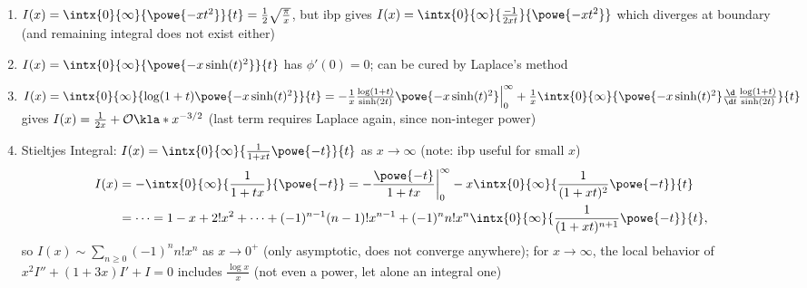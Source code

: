 \documentclass[english, parskip=full]{scrbook}
\newcommand{\example}[3]{\begin{tcolorbox}[colback=colorbackgroundexample,colframe=colorexample, breakable,enhanced,title={\textbf{#1}: #2.}]#3\end{tcolorbox}}
\begin{document}
\example{Four examples}{}{\begin{enumerate}
\item $I(x) = \intx{0}{\infty}{\powe{-xt^2}}{t} = \frac{1}{2} \sqrt{\frac{\pi}{x}}$, but \gls{ibp} gives $I(x) = \intx{0}{\infty}{\frac{-1}{2xt}}{\powe{-xt^2}}$ which diverges at boundary (and remaining integral does not exist either)
\item $I(x)=\intx{0}{\infty}{\powe{-x\sinh(t)^2}}{t}$ has $\phi'(0)=0$; can be cured by Laplace's method
\item $I(x) = \intx{0}{\infty}{\log(1+t) \powe{-x\sinh(t)^2}}{t} = -\frac{1}{x} \frac{\log(1+t)}{\sinh(2t)} \powe{-x\sinh(t)^2} \Big\vert_0^\infty + \frac{1}{x} \intx{0}{\infty}{\powe{-x\sinh(t)^2} \frac{\d}{\d t} \frac{\log(1+t)}{\sinh(2t)}}{t}$ gives $I(x) = \frac{1}{2x} + \mathcal{O}\kla*{x^{-3/2}}$ (last term requires Laplace again, since non-integer power)
\item Stieltjes Integral: $I(x) = \intx{0}{\infty}{\frac{1}{1+xt} \powe{-t}}{t}$ as $x\rightarrow\infty$ (note: \gls{ibp} useful for small $x$) \begin{align}
I(x) &= -\intx{0}{\infty}{\frac{1}{1+tx}}{\powe{-t}} = -\frac{\powe{-t}}{1+tx}\bigg\vert_0^\infty - x \intx{0}{\infty}{\frac{1}{(1+xt)^2} \powe{-t}}{t} \\
&= \dots = 1 - x + 2!x^2 + \dots + (-1)^{n-1} (n-1)!x^{n-1} + (-1)^n n! x^n \intx{0}{\infty}{\frac{1}{(1+xt)^{n+1}} \powe{-t}}{t},
\end{align}
so $I(x) \sim \sum_{n\ge 0} (-1)^n n! x^n$ as $x\rightarrow 0^+$ (only asymptotic, does not converge anywhere); for $x\rightarrow\infty$, the local behavior of $x^2I'' + (1+3x)I'+I=0$ includes $\frac{\log x}{x}$ (not even a power, let alone an integral one)
\end{enumerate}
}
\end{document}
